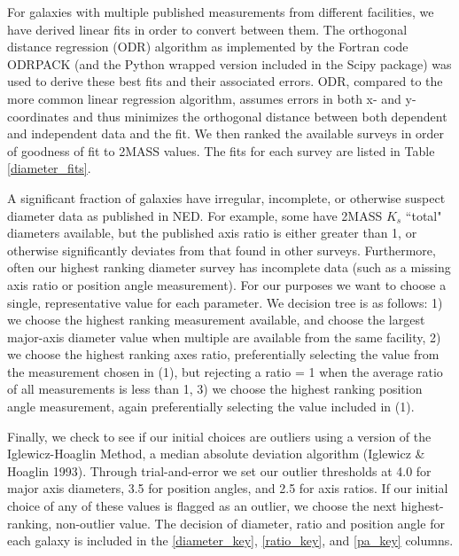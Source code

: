 \documentclass[iop]{emulateapj-rtx4}
\begin{document}
For galaxies with multiple published measurements from different facilities, we have derived linear fits in order to convert between them. The orthogonal distance regression (ODR) algorithm as implemented by the Fortran code ODRPACK (and the Python wrapped version included in the Scipy package) was used to derive these best fits and their associated errors. ODR, compared to the more common linear regression algorithm, assumes errors in both x- and y-coordinates and thus minimizes the orthogonal distance between both dependent and independent data and the fit. We then ranked the available surveys in order of goodness of fit to 2MASS values. The fits for each survey are listed in Table \ref{diameter_fits}. 

A significant fraction of galaxies have irregular, incomplete, or otherwise suspect diameter data as published in NED. For example, some have 2MASS $K_s$ ``total" diameters available, but the published axis ratio is either greater than 1, or otherwise significantly deviates from that found in other surveys. Furthermore, often our highest ranking diameter survey has incomplete data (such as a missing axis ratio or position angle measurement). For our purposes we want to choose a single, representative value for each parameter. We decision tree is as follows: 1) we choose the highest ranking measurement available, and choose the largest major-axis diameter value when multiple are available from the same facility, 2) we choose the highest ranking axes ratio, preferentially selecting the value from the measurement chosen in (1), but rejecting a ratio = 1 when the average ratio of all measurements is less than 1, 3) we choose the highest ranking position angle measurement, again preferentially selecting the value included in (1). 

Finally, we check to see if our initial choices are outliers using a version of the Iglewicz-Hoaglin Method, a median absolute deviation algorithm (Iglewicz \& Hoaglin 1993). Through trial-and-error we set our outlier thresholds at 4.0 for major axis diameters, 3.5 for position angles, and 2.5 for axis ratios. If our initial choice of any of these values is flagged as an outlier, we choose the next highest-ranking, non-outlier value. The decision of diameter, ratio and position angle for each galaxy is included in the \ref{diameter_key}, \ref{ratio_key}, and \ref{pa_key} columns.


\end{document}
